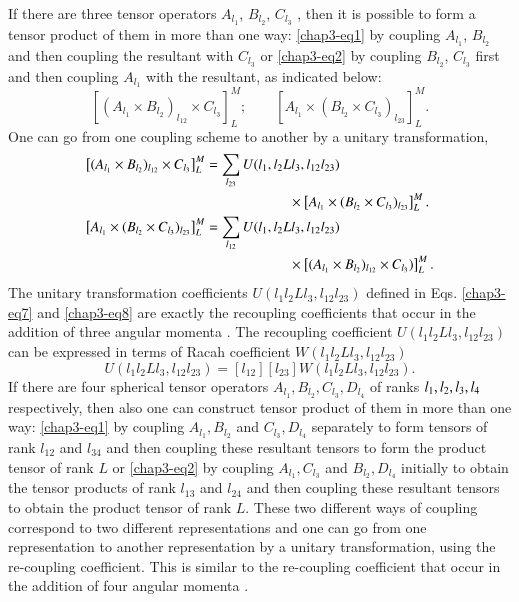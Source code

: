 If there are three tensor operators $A_{l_1}$, $B_{l_2}$, $C_{l_3}$ , then it is possible to form a tensor product of them in more than one way: \eqref{chap3-eq1} by coupling $A_{l_1}$, $B_{l_2}$ and then coupling the resultant with $C_{l_3}$ or \eqref{chap3-eq2} by coupling $B_{l_2}$, $C_{l_3}$ first and then coupling $A_{l_1}$ with the resultant, as indicated below:
\begin{equation}
\left[ (A_{l_1} \times B_{l_2})_{l_{12}} \times C_{l_3}\right]^M_L;  \qquad \left[ A_{l_1} \times (B_{l_2} \times C_{l_3})_{l_{23}}\right]^M_L. \label{chap3-eq6}
\end{equation}
One can go from one coupling scheme to another by a unitary transformation,
\begin{align}
\left[ (A_{l_1} \times B_{l_2})_{l_{12}} \times C_{l_3}\right]^M_L  & = \sum_{l_{23}} U (l_1, l_2 L l_3, l_{12} l_{23})\notag \\ 
& \qquad \qquad \qquad \times \left[A_{l_1} \times (B_{l_2} \times C_{l_3})_{l_{23}} \right]^M_L. \label{chap3-eq7}\\ 
\left[ A_{l_1} \times (B_{l_2} \times C_{l_3})_{l_{23}}\right]^M_L & = \sum_{l_{12}} U (l_1, l_2 L l_3, l_{12} l_{23}) \notag \\
& \qquad \qquad \qquad \times \left[(A_{l_1} \times B_{l_2})_{l_{12}} \times C_{l_3}) \right]^M_L. \label{chap3-eq8} 
\end{align}
The unitary transformation coefficients $U (l_1 l_2 L l_3, l_{12} l_{23})$ defined in Eqs. \eqref{chap3-eq7} and \eqref{chap3-eq8} are exactly the recoupling coefficients that occur in the addition of three angular momenta \cite{chap3-key11,chap3-key12}. The recoupling coefficient $U (l_1 l_2 Ll_3 , l_{12} l_{23})$ can be expressed in terms of Racah coefficient $W (l_1 l_2 Ll_3 , l_{12} l_{23})$ 
\begin{equation}
U (l_1 l_2 Ll_3 , l_{12} l_{23}) = [l_{12}][l_{23}] W (l_{1} l_2 Ll_3 , l_{12} l_{23}). \label{chap3-eq9}
\end{equation}
If there are four spherical tensor operators $A_{l_1}, B_{l_2}, C_{l_3}, D_{l_4}$ of ranks $l_1, l_2,\break l_3, l_4$ respectively, then also one can construct tensor product of them in more than one way: \eqref{chap3-eq1} by coupling $A_{l_1}, B_{l_2}$ and $C_{l_3}, D_{l_4}$ separately to form tensors of rank $l_{12}$ and $l_{34}$ and then coupling these resultant tensors to form the product tensor of rank $L$ or \eqref{chap3-eq2} by coupling $A_{l_1}, C_{l_3}$ and $B_{l_2}, D_{l_4}$ initially to obtain the tensor products of rank $l_{13}$ and $l_{24}$ and then coupling these resultant tensors to obtain the product tensor of rank $L$. These two different ways of coupling correspond to two different representations and one can go from one representation to another representation by a unitary transformation, using the re-coupling coefficient. This is similar to the re-coupling coefficient that occur in the addition of four angular momenta \cite{chap3-key11,chap3-key12}.

